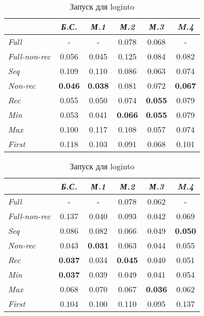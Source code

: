 \begin{table}[h!]
\center
\begin{tabular}{|l|c|c|c|c|c|}
\hline
   &{\it Б.С.}&{\it М.1}&{\it М.2}&{\it М.3}&{\it M.4} \\ \hline
{\it Full        }&    -         &     -        & 0.078       & 0.068 &    -  \\ \hline
{\it Full-non-rec}& 0.056        &  0.045       & 0.125       & 0.084 & 0.082 \\ \hline
{\it Seq         }& 0.109        &  0.110       & 0.086       & 0.063 & 0.074 \\ \hline
{\it Non-rec     }& {\bf 0.046}  &  {\bf 0.038} & 0.081       & 0.072 & {\bf 0.067} \\ \hline
{\it Rec         }& 0.055        &  0.050       & 0.074       & {\bf 0.055} & 0.079 \\ \hline
{\it Min         }& 0.053        &  0.041       & {\bf 0.066} & {\bf 0.055} & 0.079 \\ \hline
{\it Max         }& 0.100        &  0.117       & 0.108       & 0.057 & 0.074 \\ \hline
{\it First       }& 0.118        &  0.103       & 0.091       & 0.068 & 0.101 \\ \hline
\end{tabular}
\caption{Запуск для loginto }
\end{table}

\begin{table}[h!]
\center
\begin{tabular}{|l|c|c|c|c|c|}
\hline
   &{\it Б.С.}&{\it М.1}&{\it М.2}&{\it М.3}&{\it M.4} \\ \hline
{\it Full        }&    -        &    -        & 0.078       & 0.062      &    - \\ \hline
{\it Full-non-rec}& 0.137       & 0.040       & 0.093       & 0.042      & 0.069 \\ \hline
{\it Seq         }& 0.086       & 0.082       & 0.066       & 0.049      & {\bf 0.050} \\ \hline
{\it Non-rec     }& 0.043       & {\bf 0.031} & 0.063       & 0.044      & 0.055 \\ \hline
{\it Rec         }& {\bf 0.037} & 0.034       & {\bf 0.045} & 0.040      & 0.051 \\ \hline
{\it Min         }& {\bf 0.037} & 0.039       & 0.049       & 0.041      & 0.054 \\ \hline
{\it Max         }& 0.068       & 0.070       & 0.067       &{\bf 0.036} & 0.062 \\ \hline
{\it First       }& 0.104       & 0.100       & 0.110       & 0.095      & 0.137 \\ \hline
\end{tabular}
\caption{Запуск для loginto }
\end{table}


